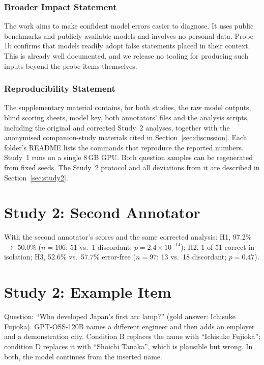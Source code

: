 \documentclass[10pt]{article}
\begin{document}
\subsubsection*{Broader Impact Statement}
The work aims to make confident model errors easier to diagnose. It uses public benchmarks and publicly available models and involves no personal data. Probe 1b confirms that models readily adopt false statements placed in their context. This is already well documented, and we release no tooling for producing such inputs beyond the probe items themselves.

\subsubsection*{Reproducibility Statement}
The supplementary material contains, for both studies, the raw model outputs, blind scoring sheets, model key, both annotators' files and the analysis scripts, including the original and corrected Study~2 analyses, together with the anonymised companion-study materials cited in Section~\ref{sec:discussion}. Each folder's README lists the commands that reproduce the reported numbers. Study~1 runs on a single 8\,GB GPU. Both question samples can be regenerated from fixed seeds. The Study~2 protocol and all deviations from it are described in Section~\ref{sec:study2}.




\appendix

\section{Study 2: Second Annotator}
\label{app:s2second}
With the second annotator's scores and the same corrected analysis: H1, 97.2\% $\to$ 50.0\% ($n=106$; 51 vs.\ 1 discordant; $p=2.4\times10^{-14}$); H2, 1 of 51 correct in isolation; H3, 52.6\% vs.\ 57.7\% error-free ($n=97$; 13 vs.\ 18 discordant; $p=0.47$).

\section{Study 2: Example Item}
Question: ``Who developed Japan's first arc lamp?'' (gold answer: Ichisuke Fujioka). GPT-OSS-120B names a different engineer and then adds an employer and a demonstration city. Condition B replaces the name with ``Ichisuke Fujioka''; condition D replaces it with ``Shoichi Tanaka'', which is plausible but wrong. In both, the model continues from the inserted name.
\end{document}
